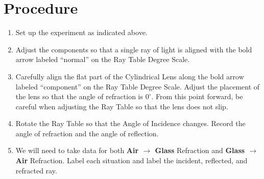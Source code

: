 \documentclass[10pt]{exam}
\begin{document}
\section*{Procedure}
\begin{enumerate}
  \item Set up the experiment as indicated above.
  \item Adjust the components so that a single ray of light is aligned with the bold arrow labeled ``normal'' on the Ray Table Degree Scale.
  \item Carefully align the flat part of the Cylindrical Lens along the bold arrow labeled ``component'' on the Ray Table Degree Scale.  Adjust the placement of the lens so that the angle of refraction is $0^\circ$.  From this point forward, be careful when adjusting the Ray Table so that the lens does not slip.
  \item Rotate the Ray Table so that the Angle of Incidence changes.  Record the angle of refraction and the angle of reflection.
  \item We will need to take data for both {\bf Air $\rightarrow$ Glass} Refraction and {\bf Glass $\rightarrow$ Air} Refraction.  Label each situation and label the incident, reflected, and refracted ray. 
  
  \begin{center}
\end{center}
\end{enumerate}
\end{document}
